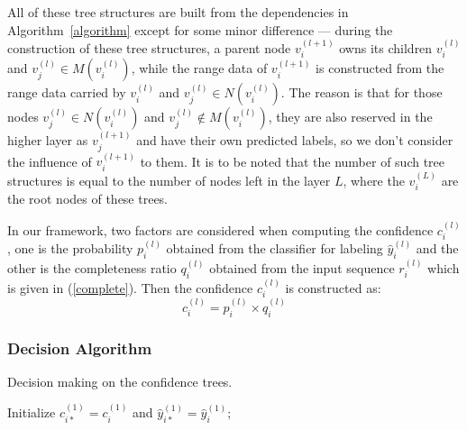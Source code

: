 \documentclass[letterpaper, 10 pt, conference]{ieeeconf}  %
\begin{document}
All of these tree structures are built from the dependencies in Algorithm~\ref{algorithm} except for some minor difference --- during the construction of these tree structures, a parent node $v_i^{(l+1)}$ owns its children $v_i^{(l)}$ and $v_j^{(l)}\in M(v_i^{(l)})$, while the range data of $v_i^{(l+1)}$ is constructed from the range data carried by $v_i^{(l)}$ and $v_j^{(l)}\in N(v_i^{(l)})$. The reason is that for those nodes $v_j^{(l)}\in N(v_i^{(l)})$ and $v_j^{(l)}\notin M(v_i^{(l)})$, they are also reserved in the higher layer as  $v_j^{(l+1)}$ and have their own predicted labels, so we don't consider the influence of $v_i^{(l+1)}$ to them. It is to be noted that the number of such tree structures is equal to the number of nodes left in the layer $L$, where the $v_i^{(L)}$ are the root nodes of these trees.


In our framework, two factors are considered when computing the confidence $c_i^{(l)}$, one is the probability $p_i^{(l)}$ obtained from the classifier for labeling $\hat{y}_i^{(l)}$ and the other is the completeness ratio $q_i^{(l)}$ obtained from the input sequence $r_i^{(l)}$ which is given in (\ref{complete}). Then the confidence $c_i^{(l)}$ is constructed as:
\begin{equation}\label{confidence}
c_i^{(l)} = p_i^{(l)} \times q_i^{(l)}
\end{equation}






\subsubsection{Decision Algorithm}


\begin{algorithm}[tpb]\label{algorithm2}
\caption{Decision making on the confidence trees.}

\SetAlgoNoLine\LinesNumbered {}
\BlankLine
Initialize $c_{i*}^{(1)} = c_i^{(1)}$ and $\hat{y}_{i*}^{(1)} = \hat{y}_i^{(1)}$;\\
\end{algorithm}
\end{document}
